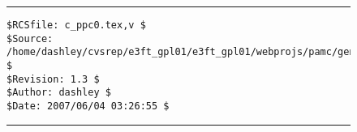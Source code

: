 \noindent\begin{figure}[!b]
\noindent\rule[-0.25in]{\textwidth}{1pt}
\begin{tiny}
\begin{verbatim}
$RCSfile: c_ppc0.tex,v $
$Source: /home/dashley/cvsrep/e3ft_gpl01/e3ft_gpl01/webprojs/pamc/gen_a/docs/manual/man_a/c_ppc0/c_ppc0.tex,v $
$Revision: 1.3 $
$Author: dashley $
$Date: 2007/06/04 03:26:55 $
\end{verbatim}
\end{tiny}
\noindent\rule[0.25in]{\textwidth}{1pt}
\end{figure}

%
%
%
